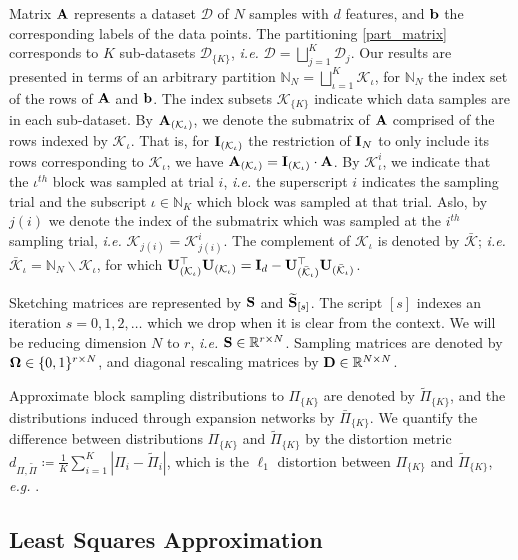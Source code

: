 \documentclass[journal,letterpaper,onecolumn,twoside,nofonttune]{IEEEtran}
\newcommand{\N}{\mathbb{N}}
\newcommand{\R}{\mathbb{R}}
\newcommand{\D}{\mathcal{D}}
\newcommand{\K}{\mathcal{K}}
\newcommand{\Kbar}{\bar{\mathcal{K}}}
\newcommand{\bb}{\bold{b}}
\newcommand{\Ub}{\bold{U}}
\newcommand{\Ab}{\bold{A}}
\newcommand{\Db}{\bold{D}}
\newcommand{\Ib}{\bold{I}}
\newcommand{\Sb}{\bold{S}}
\newcommand{\Sbwt}{\widetilde{\Sb}}
\newcommand{\Omb}{\bold{\Omega}}
\newcommand{\Pib}{\bar{\Pi}}
\newcommand{\Pit}{\tilde{\Pi}}
\begin{document}
Matrix $\Ab$ represents a dataset $\D$ of $N$ samples with $d$ features, and $\bb$ the corresponding labels of the data points. The partitioning \eqref{part_matrix} corresponds to $K$ sub-datasets $\D_{\{K\}}$, \textit{i.e.} $\D=\bigsqcup_{j=1}^K\D_j$. Our results are presented in terms of an arbitrary partition $\N_N=\bigsqcup_{\iota=1}^K\K_\iota$, for $\N_N$ the index set of the rows of $\Ab$ and $\bb$. The index subsets $\K_{\{K\}}$ indicate which data samples are in each sub-dataset. By $\Ab_{(\K_\iota)}$, we denote the submatrix of $\Ab$ comprised of the rows indexed by $\K_\iota$. That is, for $\Ib_{(\K_\iota)}$ the restriction of $\Ib_N$ to only include its rows corresponding to $\K_\iota$, we have $\Ab_{(\K_\iota)}=\Ib_{(\K_\iota)}\cdot\Ab$. By $\K_{\iota}^i$, we indicate that the $\iota^{th}$ block was sampled at trial $i$, \textit{i.e.} the superscript $i$ indicates the sampling trial and the subscript $\iota\in\N_K$ which block was sampled at that trial. Aslo, by $j(i)$ we denote the index of the submatrix which was sampled at the $i^{th}$ sampling trial, \textit{i.e.} $\K_{j(i)}=\K_{j(i)}^i$. The complement of $\K_\iota$ is denoted by $\Kbar$; \textit{i.e.} $\Kbar_{\iota}=\N_N\backslash\K_\iota$, for which $\Ub_{(\K_\iota)}^\top\Ub_{(\K_\iota)}=\Ib_d-\Ub_{(\Kbar_\iota)}^\top\Ub_{(\Kbar_\iota)}$.

Sketching matrices are represented by $\Sb$ and $\Sbwt_{[s]}$. The script $[s]$ indexes an iteration $s=0,1,2,\ldots$ which we drop when it is clear from the context. We will be reducing dimension $N$ to $r$, \textit{i.e.} $\Sb\in\R^{r\times N}$. Sampling matrices are denoted by $\Omb\in\{0,1\}^{r\times N}$, and diagonal rescaling matrices by $\Db\in\R^{N\times N}$.

Approximate block sampling distributions to $\Pi_{\{K\}}$ are denoted by $\Pit_{\{K\}}$, and the distributions induced through expansion networks by $\Pib_{\{K\}}$. We quantify the difference between distributions $\Pi_{\{K\}}$ and $\Pit_{\{K\}}$ by the distortion metric $d_{\Pi,\Pit}\coloneqq\frac{1}{K}\sum_{i=1}^K|\Pi_i-\Pit_i|$, which is the $\ell_1$ distortion between $\Pi_{\{K\}}$ and $\Pit_{\{K\}}$, \textit{e.g.} \cite{IWN22}.

\subsection{Least Squares Approximation}
\end{document}
